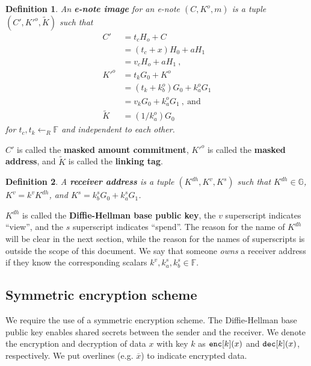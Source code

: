 \documentclass{article}
\newtheorem{definition}{Definition}[section]
\begin{document}
\begin{definition}\label{e-note-img}
An \textbf{\em e-note image} for an e-note $(C, K^o, m)$ is a tuple $(C', K'^o, \tilde{K})$ such that
\begin{align*}
C' &= t_c H_o + C \\ &= (t_c+x)H_0 + aH_1 \\ &= v_c H_o + aH_1 \ , \\
K'^o &= t_k G_0 + K^o \\ &= (t_k + k_b^o) G_0 + k_a^o G_1 \\ &= v_k G_0 + k_a^o G_1 \ ,\ \text{and} \\
\tilde{K} &= (1/k_a^o)G_0
\end{align*}
for $t_c, t_k \leftarrow_R\mathbb{F}$ and independent to each other.
\end{definition}
$C'$ is called the \textbf{masked amount commitment}, $K'^o$ is called the \textbf{masked address}, and $\tilde{K}$ is called the \textbf{linking tag}.

\begin{definition}\label{recv-addr}
A \textbf{\em receiver address} is a tuple $(K^{dh}, K^v, K^s)$  such that $K^{dh}\in\mathbb{G}$, $K^v = k^v K^{dh}$, and $K^s = k_b^s G_0 + k_a^s G_1$.
\end{definition}
$K^{dh}$ is called the \textbf{Diffie-Hellman base public key}, the $v$ superscript indicates ``view'', and the $s$ superscript indicates ``spend''. The reason for the name of $K^{dh}$ will be clear in the next section, while the reason for the names of superscripts is outside the scope of this document. We say that someone \textit{owns} a receiver address if they know the corresponding scalars $k^v, k_a^s, k_b^s \in\mathbb{F}$.

\subsection{Symmetric encryption scheme}
We require the use of a symmetric encryption scheme. The Diffie-Hellman base public key enables shared secrets between the sender and the receiver. We denote the encryption and decryption of data $x$ with key $k$ as ${\tt enc}[k](x)$ and ${\tt dec}[k](x)$, respectively. We put overlines (e.g. $\overline{x}$) to indicate encrypted data.
\end{document}

